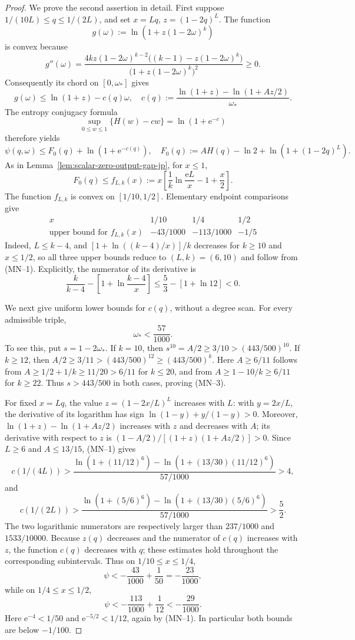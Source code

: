 \documentclass[11pt]{article}
\theoremstyle{definition}
\begin{document}
\begin{proof}
We prove the second assertion in detail.  First suppose
\(1/(10L)\le q\le1/(2L)\), and set \(x=Lq\),
\(z=(1-2q)^L\).  The function
\[
g(\omega):=\ln\!\left(1+z(1-2\omega)^k\right)
\]
is convex because
\[
g''(\omega)=
\frac{4kz(1-2\omega)^{k-2}
\bigl((k-1)-z(1-2\omega)^k\bigr)}
{\bigl(1+z(1-2\omega)^k\bigr)^2}\ge0.
\]
Consequently its chord on \([0,\omega_*]\) gives
\[
g(\omega)\le\ln(1+z)-c(q)\omega,
\quad
c(q):=\frac{\ln(1+z)-\ln(1+Az/2)}{\omega_*}.
\]
The entropy conjugacy formula
\[
\sup_{0\le w\le1}\{H(w)-cw\}=\ln(1+\mathrm e^{-c})
\]
therefore yields
\[
\psi(q,\omega)
\le F_0(q)+\ln(1+\mathrm e^{-c(q)}),
\quad
F_0(q):=AH(q)-\ln2+\ln(1+(1-2q)^L).
\]
As in Lemma~\ref{lem:scalar-zero-output-gap-jp}, for \(x\le1\),
\[
F_0(q)\le
f_{L,k}(x):=
x\left[\frac1k\ln\frac{\mathrm eL}{x}-1+\frac x2\right].
\]
The function \(f_{L,k}\) is convex on \([1/10,1/2]\).  Elementary
endpoint comparisons give
\[
\begin{array}{c|ccc}
x&1/10&1/4&1/2\\ \hline
\text{upper bound for }f_{L,k}(x)&-43/1000&-113/1000&-1/5
\end{array}
\]
Indeed, \(L\le k-4\), and
\([1+\ln((k-4)/x)]/k\) decreases for \(k\ge10\) and
\(x\le1/2\), so all three upper bounds reduce to \((L,k)=(6,10)\)
and follow from (MN--1).
Explicitly, the numerator of its derivative is
\[
 \frac{k}{k-4}-\left[1+\ln\frac{k-4}{x}\right]
 \le\frac53-[1+\ln12]<0.
\]

We next give uniform lower bounds for \(c(q)\), without a degree scan.
For every admissible triple,
\[
 \omega_*<\frac{57}{1000}.                                  \tag{MN--3}
\]
To see this, put \(s=1-2\omega_*\).  If \(k=10\), then
\(s^{10}=A/2\ge3/10>(443/500)^{10}\).  If \(k\ge12\), then
\(A/2\ge3/11>(443/500)^{12}\ge(443/500)^k\).  Here
\(A\ge6/11\) follows from
\(A\ge1/2+1/k\ge11/20>6/11\) for \(k\le20\), and from
\(A\ge1-10/k\ge6/11\) for \(k\ge22\).  Thus
\(s>443/500\) in both cases, proving (MN--3).

For fixed \(x=Lq\), the value
\(z=(1-2x/L)^L\) increases with \(L\): with \(y=2x/L\), the derivative
of its logarithm has sign
\(\ln(1-y)+y/(1-y)>0\).  Moreover,
\(\ln(1+z)-\ln(1+Az/2)\) increases with \(z\) and decreases with
\(A\); its derivative with respect to \(z\) is
\((1-A/2)/[(1+z)(1+Az/2)]>0\).  Since \(L\ge6\) and
\(A\le13/15\), (MN--1) gives
\[
c(1/(4L))>
\frac{\ln(1+(11/12)^6)-\ln(1+(13/30)(11/12)^6)}{57/1000}>4,
\]
and
\[
c(1/(2L))>
\frac{\ln(1+(5/6)^6)-\ln(1+(13/30)(5/6)^6)}{57/1000}>\frac52.
\]
The two logarithmic numerators are respectively larger than
\(237/1000\) and \(1533/10000\).  Because \(z(q)\) decreases and the numerator
of \(c(q)\) increases with \(z\), the function \(c(q)\) decreases with \(q\);
these estimates hold throughout the corresponding subintervals.
Thus on \(1/10\le x\le1/4\),
\[
\psi<-\frac{43}{1000}+\frac1{50}=-\frac{23}{1000},
\]
while on \(1/4\le x\le1/2\),
\[
\psi<-\frac{113}{1000}+\frac1{12}< -\frac{29}{1000}.
\]
Here \(\mathrm e^{-4}<1/50\) and \(\mathrm e^{-5/2}<1/12\), again
by (MN--1).  In particular both bounds are below \(-1/100\).


\end{proof}
\end{document}
